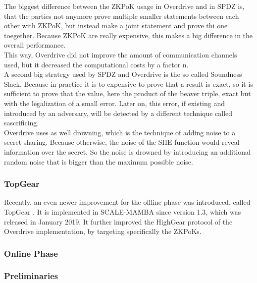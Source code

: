\documentclass[english,runningheads,a4paper]{llncs}[2018/03/10]
\begin{document}
The biggest difference between the ZKPoK usage in Overdrive and in SPDZ is, that the parties not anymore prove multiple smaller statements between each other with ZKPoK, but instead make a joint statement and prove thi one toegether. Because ZKPoK are really expensive, this makes a big difference in the overall performance.\\
This way, Overdrive did not improve the amount of communication channels used, but it decreased the computational costs by a factor n.\\
A second big strategy used by SPDZ and Overdrive is the so called Soundness Slack. Because in practice it is to expensive to prove that a result is exact, so it is sufficient to prove that the value, here the product of the beaver triple, exact but with the legalization of a small error. Later on, this error, if existing and introduced by an adversary, will be detected by a different technique called sascrificing.\\
Overdrive uses as well drowning, which is the technique of adding noise to a secret sharing. Because otherwise, the noise of the SHE function would reveal information over the secret. So the noise is drowned by introducing an additional random noise that is bigger than the maximum possible noise.\\


\subsubsection{TopGear}
Recently, an even newer improvement for the offline phase was introduced, called TopGear \cite{cryptoeprint:2019:035}. It is implemented in SCALE-MAMBA since version 1.3\cite{ScaleMambaDocu}, which was released in January 2019. It further improved the HighGear protocol of the Overdrive implementation, by targeting specifically the ZKPoKs.



\subsubsection{Online Phase}

\subsubsection{Preliminaries}
\end{document}
